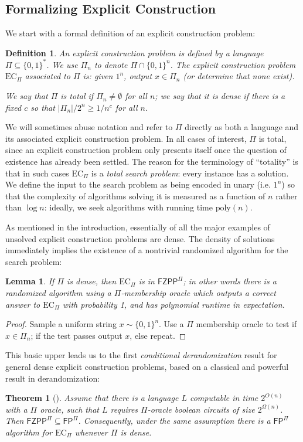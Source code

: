 \documentclass[11pt]{article}
\newtheorem{theorem}{Theorem}
\newtheorem{lemma}{Lemma}
\newtheorem{definition}{Definition}
\newcommand{\B}{\{0,1\}}
\newcommand{\poly}{\mathrm{poly}}
\newcommand{\ec}{\mathrm{EC}_\Pi}
\begin{document}
\subsection{Formalizing Explicit Construction}\label{sec:explicit-basics}
We start with a formal definition of an explicit construction problem:
\begin{definition}
An explicit construction problem is defined by a language $\Pi \subseteq \B^*$. We use $\Pi_n$ to denote $\Pi \cap \B^n$. The explicit construction problem $\mathrm{EC}_\Pi$ associated to $\Pi$ is: given $1^n$, output $x \in \Pi_n$ (or determine that none exist).

We say that $\Pi$ is total if $\Pi_n \neq \emptyset$ for all $n$; we say that it is dense if there is a fixed $c$ so that $|\Pi_n|/2^n \geq 1/n^c$ for all $n$.
\end{definition}
We will sometimes abuse notation and refer to $\Pi$ directly as both a language and its associated explicit construction problem. In all cases of interest, $\Pi$ is total, since an explicit construction problem only presents itself once the question of existence has already been settled. The reason for the terminology of ``totality'' is that in such cases $\mathrm{EC}_\Pi$ is a \emph{total search problem}: every instance has a solution. We define the input to the search problem as being encoded in unary (i.e. $1^n$) so that the complexity of algorithms solving it is measured as a function of $n$ rather than $\log n$: ideally, we seek algorithms with running time $\poly(n)$.

As mentioned in the introduction, essentially of all the major examples of unsolved explicit construction problems are dense. The density of solutions immediately implies the existence of a nontrivial randomized algorithm for the search problem:
\begin{lemma}\label{lem:rand-const}
If $\Pi $ is dense, then $\mathrm{EC}_{\Pi}$ is in $\mathsf{FZPP}^{\Pi}$; in other words there is a randomized algorithm using a $\Pi$-membership oracle which outputs a correct answer to $\ec$ with probability 1, and has polynomial runtime in expectation. 
\end{lemma}
\begin{proof}
Sample a uniform string $x \sim \B^n$. Use a $\Pi$ membership oracle to test if $x \in \Pi_n$; if the test passes output $x$, else repeat.
\end{proof}


This basic upper leads us to the first \emph{conditional derandomization} result for general dense explicit construction problems, based on a classical and powerful result in derandomization:
\begin{theorem}[\cite{NW,IW,AM-derandomization}]\label{lem:dense-hardness-rand}
Assume that there is a language $L$ computable in time $2^{O(n)}$ with a $\Pi$ oracle, such that $L$ requires $\Pi$-oracle boolean circuits of size $2^{\Omega(n)}$. Then $\mathsf{FZPP}^\Pi\subseteq \mathsf{FP}^{\Pi}$. Consequently, under the same assumption there is a $\mathsf{FP}^\Pi$ algorithm for $\ec$ whenever $\Pi$ is dense.
\end{theorem}
\end{document}

